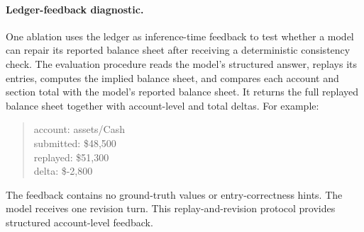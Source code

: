\paragraph{Ledger-feedback diagnostic.}
\label{sec:verifier}
One ablation uses the ledger as inference-time feedback to test whether a model can repair its reported balance sheet after receiving a deterministic consistency check. The evaluation procedure reads the model's structured answer, replays its entries, computes the implied balance sheet, and compares each account and section total with the model's reported balance sheet. It returns the full replayed balance sheet together with account-level and total deltas. For example:
\begin{quote}
\small\ttfamily
account: assets/Cash\\
submitted: \$48{,}500\\
replayed: \$51{,}300\\
delta: \$-2{,}800
\end{quote}
The feedback contains no ground-truth values or entry-correctness hints. The model receives one revision turn. This replay-and-revision protocol provides structured account-level feedback.
